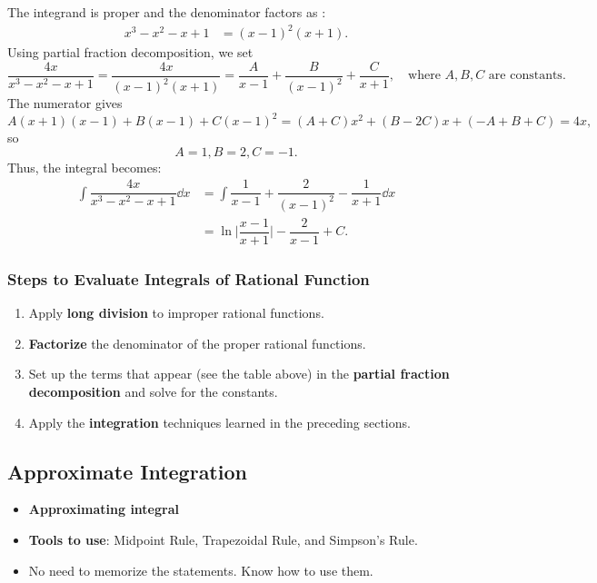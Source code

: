 \begin{ex}
   The integrand is proper and the denominator factors as :
    \begin{align*}
        x^3 - x^2 - x + 1 &= (x-1)^2(x+1).
    \end{align*}
    Using partial fraction decomposition, we set
    \[\dfrac{4x}{x^3 - x^2 - x + 1} = \dfrac{4x}{(x-1)^2(x+1)} = \dfrac{A}{x-1} + \dfrac{B}{(x-1)^2}+ \dfrac{C}{x+1}, \quad \text{where } A, B, C \text{ are constants.} \]
    The numerator gives 
    \[A(x+1)(x-1)+B(x-1)+C(x-1)^2 = (A+C)x^2+(B-2C)x+(-A+B+C) = 4x,\]
    so \[ A=1, B=2, C=-1.\]
    Thus, the integral becomes:
    \begin{align*}
        \int \dfrac{4x}{x^3 - x^2 - x + 1} \dd x &= \int \dfrac{1}{x-1} + \dfrac{2}{(x-1)^2} - \dfrac{1}{x+1} \dd x\\
        &= \ln\Big|\dfrac{x-1}{x+1}\Big| - \dfrac{2}{x-1} + C.
    \end{align*}
\end{ex}

\subsubsection{Steps to Evaluate Integrals of Rational Function} 
\begin{enumerate} 
    \item Apply \textbf{long division} to improper rational functions.
    \item \textbf{Factorize} the denominator of the proper rational functions.
    \item Set up the terms that appear (see the table above) in the \textbf{partial fraction decomposition} and solve for the constants.
    \item Apply the \textbf{integration} techniques learned in the preceding sections.
\end{enumerate}



\subsection{Approximate Integration} 
\begin{center}
\begin{tcolorbox}
    \begin{itemize}
        \item \textbf{Approximating integral}

        \item \textbf{Tools to use}: Midpoint Rule, Trapezoidal Rule, and Simpson's Rule.
        \item No need to memorize the statements. Know how to use them.
    \end{itemize}
\end{tcolorbox}
\end{center}

